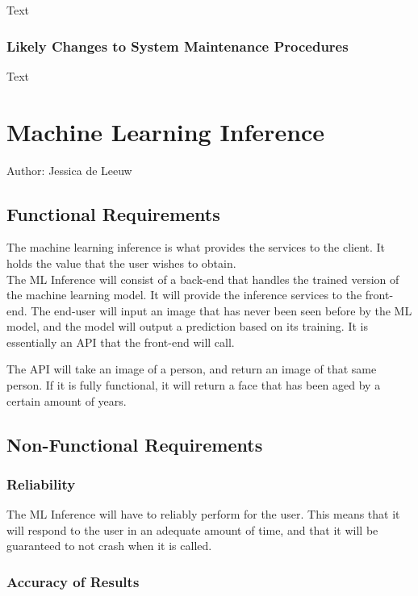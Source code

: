 \documentclass[12pt]{article}
\begin{document}
Text

\subsubsection {Likely Changes to System Maintenance Procedures}

Text

\section{Machine Learning Inference}
Author: Jessica de Leeuw\\

\subsection{Functional Requirements}

The machine learning inference is what provides the services to the client. It holds the value that the user wishes to obtain.\\

The ML Inference will consist of a back-end that handles the trained version of the machine learning model. It will provide the inference services to the front-end. The end-user will input an image that has never been seen before by the ML model, and the model will output a prediction based on its training. It is essentially an API that the front-end will call.

The API will take an image of a person, and return an image of that same person. If it is fully functional, it will return a face that has been aged by a certain amount of years.

\subsection{Non-Functional Requirements}

\subsubsection {Reliability}

The ML Inference will have to reliably perform for the user. This means that it will respond to the user in an adequate amount of time, and that it will be guaranteed to not crash when it is called.

\subsubsection {Accuracy of Results}
\end{document}
